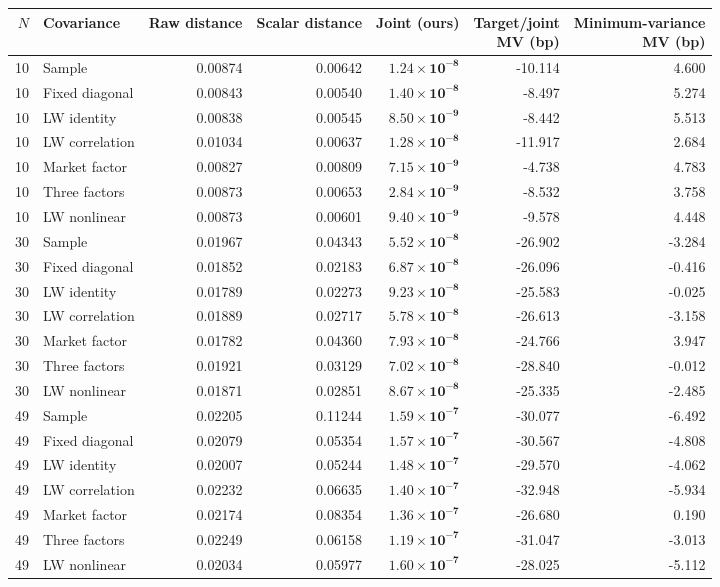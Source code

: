 \begin{tabular}{rlrrrrr}\toprule
$N$ & Covariance & Raw distance & Scalar distance & \textbf{Joint (ours)} & \shortstack{Target/joint\\MV (bp)} & \shortstack{Minimum-variance\\MV (bp)}\\\midrule
10 & Sample & 0.00874 & 0.00642 & $\mathbf{1.24\times10^{-8}}$ & -10.114 & 4.600 \\
10 & Fixed diagonal & 0.00843 & 0.00540 & $\mathbf{1.40\times10^{-8}}$ & -8.497 & 5.274 \\
10 & LW identity & 0.00838 & 0.00545 & $\mathbf{8.50\times10^{-9}}$ & -8.442 & 5.513 \\
10 & LW correlation & 0.01034 & 0.00637 & $\mathbf{1.28\times10^{-8}}$ & -11.917 & 2.684 \\
10 & Market factor & 0.00827 & 0.00809 & $\mathbf{7.15\times10^{-9}}$ & -4.738 & 4.783 \\
10 & Three factors & 0.00873 & 0.00653 & $\mathbf{2.84\times10^{-9}}$ & -8.532 & 3.758 \\
10 & LW nonlinear & 0.00873 & 0.00601 & $\mathbf{9.40\times10^{-9}}$ & -9.578 & 4.448 \\
\midrule
30 & Sample & 0.01967 & 0.04343 & $\mathbf{5.52\times10^{-8}}$ & -26.902 & -3.284 \\
30 & Fixed diagonal & 0.01852 & 0.02183 & $\mathbf{6.87\times10^{-8}}$ & -26.096 & -0.416 \\
30 & LW identity & 0.01789 & 0.02273 & $\mathbf{9.23\times10^{-8}}$ & -25.583 & -0.025 \\
30 & LW correlation & 0.01889 & 0.02717 & $\mathbf{5.78\times10^{-8}}$ & -26.613 & -3.158 \\
30 & Market factor & 0.01782 & 0.04360 & $\mathbf{7.93\times10^{-8}}$ & -24.766 & 3.947 \\
30 & Three factors & 0.01921 & 0.03129 & $\mathbf{7.02\times10^{-8}}$ & -28.840 & -0.012 \\
30 & LW nonlinear & 0.01871 & 0.02851 & $\mathbf{8.67\times10^{-8}}$ & -25.335 & -2.485 \\
\midrule
49 & Sample & 0.02205 & 0.11244 & $\mathbf{1.59\times10^{-7}}$ & -30.077 & -6.492 \\
49 & Fixed diagonal & 0.02079 & 0.05354 & $\mathbf{1.57\times10^{-7}}$ & -30.567 & -4.808 \\
49 & LW identity & 0.02007 & 0.05244 & $\mathbf{1.48\times10^{-7}}$ & -29.570 & -4.062 \\
49 & LW correlation & 0.02232 & 0.06635 & $\mathbf{1.40\times10^{-7}}$ & -32.948 & -5.934 \\
49 & Market factor & 0.02174 & 0.08354 & $\mathbf{1.36\times10^{-7}}$ & -26.680 & 0.190 \\
49 & Three factors & 0.02249 & 0.06158 & $\mathbf{1.19\times10^{-7}}$ & -31.047 & -3.013 \\
49 & LW nonlinear & 0.02034 & 0.05977 & $\mathbf{1.60\times10^{-7}}$ & -28.025 & -5.112 \\
\bottomrule\end{tabular}
